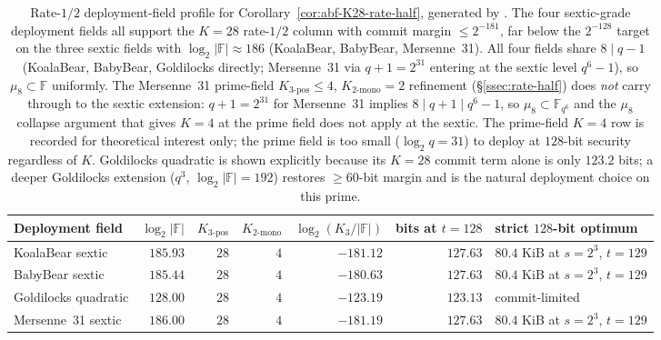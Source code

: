 \documentclass[11pt]{article}
\theoremstyle{definition}
\theoremstyle{remark}
\newcommand{\FF}{\mathbb{F}}
\begin{document}
\begin{table}[h]
\centering
\small
\begin{adjustbox}{max width=\textwidth}
\begin{tabular}{lrrrrrl}
\toprule
Deployment field & $\log_2|\FF|$ & $K_{3\text{-pos}}$ & $K_{2\text{-mono}}$ &
$\log_2(K_{3}/|\FF|)$ & bits at $t=128$ & strict $128$-bit optimum \\
\midrule
KoalaBear sextic & $185.93$ & $28$ & $4$ & $-181.12$ & $127.63$ & $80.4$ KiB at $s=2^3$, $t=129$ \\
BabyBear sextic & $185.44$ & $28$ & $4$ & $-180.63$ & $127.63$ & $80.4$ KiB at $s=2^3$, $t=129$ \\
Goldilocks quadratic & $128.00$ & $28$ & $4$ & $-123.19$ & $123.13$ & commit-limited \\
Mersenne~31 sextic & $186.00$ & $28$ & $4$ & $-181.19$ & $127.63$ & $80.4$ KiB at $s=2^3$, $t=129$ \\
\bottomrule
\end{tabular}
\end{adjustbox}
\caption{Rate-$1/2$ deployment-field profile for
Corollary~\ref{cor:abf-K28-rate-half}, generated by
\cite{CompanionRepo}.
The four sextic-grade deployment fields all support the $K = 28$
rate-$1/2$ column with commit margin $\leq 2^{-181}$, far below the
$2^{-128}$ target on the three sextic fields with $\log_2|\FF| \approx 186$
(KoalaBear, BabyBear, Mersenne~31). All four fields share
$8 \mid q - 1$ (KoalaBear, BabyBear, Goldilocks directly; Mersenne~31
via $q + 1 = 2^{31}$ entering at the sextic level $q^6 - 1$), so
$\mu_8 \subset \FF$ uniformly. The Mersenne~31 prime-field
$K_{3\text{-pos}} \leq 4$, $K_{2\text{-mono}} = 2$ refinement
(\S\ref{ssec:rate-half}) does \emph{not} carry through to the sextic
extension: $q+1 = 2^{31}$ for Mersenne~31 implies $8 \mid q+1 \mid q^6-1$,
so $\mu_8 \subset \FF_{q^6}$ and the $\mu_8$ collapse argument that
gives $K = 4$ at the prime field does not apply at the sextic. The
prime-field $K = 4$ row is recorded for theoretical interest only;
the prime field is too small ($\log_2 q = 31$) to deploy at $128$-bit
security regardless of $K$. Goldilocks quadratic is shown explicitly
because its $K = 28$ commit term alone is only $123.2$ bits; a deeper
Goldilocks extension ($q^3$, $\log_2 |\FF| = 192$) restores $\geq 60$-bit
margin and is the natural deployment choice on this prime.}
\label{tab:abf-rate-half-fields}
\end{table}
\end{document}
